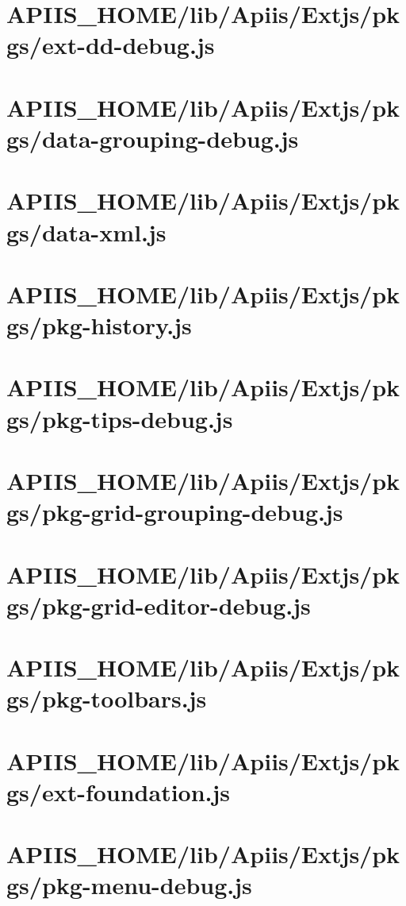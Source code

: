 \section{APIIS\_HOME/lib/Apiis/Extjs/pkgs/ext-dd-debug.js} 
\section{APIIS\_HOME/lib/Apiis/Extjs/pkgs/data-grouping-debug.js} 
\section{APIIS\_HOME/lib/Apiis/Extjs/pkgs/data-xml.js} 
\section{APIIS\_HOME/lib/Apiis/Extjs/pkgs/pkg-history.js} 
\section{APIIS\_HOME/lib/Apiis/Extjs/pkgs/pkg-tips-debug.js} 
\section{APIIS\_HOME/lib/Apiis/Extjs/pkgs/pkg-grid-grouping-debug.js} 
\section{APIIS\_HOME/lib/Apiis/Extjs/pkgs/pkg-grid-editor-debug.js} 
\section{APIIS\_HOME/lib/Apiis/Extjs/pkgs/pkg-toolbars.js} 
\section{APIIS\_HOME/lib/Apiis/Extjs/pkgs/ext-foundation.js} 
\section{APIIS\_HOME/lib/Apiis/Extjs/pkgs/pkg-menu-debug.js} 

